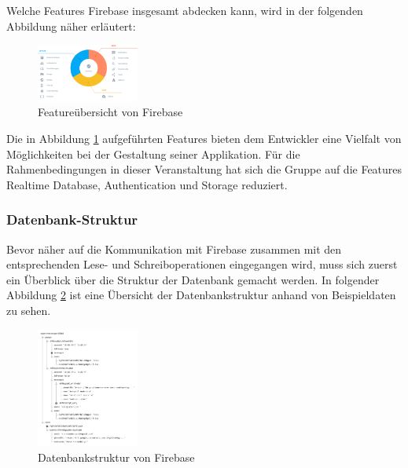 Welche Features Firebase insgesamt abdecken kann, wird in der folgenden Abbildung näher erläutert:

\begin{figure}[ht]
  \centering
    \includegraphics[width=0.3\textwidth]{images/firebase_overview}
    \caption{Featureübersicht von Firebase}
	 \label{fig:firebase_overview}
\end{figure}

Die in Abbildung \ref{fig:firebase_overview} aufgeführten Features bieten dem Entwickler eine Vielfalt von Möglichkeiten bei der Gestaltung seiner Applikation. Für die Rahmenbedingungen in dieser Veranstaltung hat sich die Gruppe auf die Features Realtime Database, Authentication und Storage reduziert.  

\subsubsection{Datenbank-Struktur}
Bevor näher auf die Kommunikation mit Firebase zusammen mit den entsprechenden Lese- und Schreiboperationen eingegangen wird, muss sich zuerst ein Überblick über die Struktur der Datenbank gemacht werden.
In folgender Abbildung \ref{fig:firebase_datastructure} ist eine Übersicht der Datenbankstruktur anhand von Beispieldaten zu sehen.

\begin{figure}[ht]
  \centering
    \includegraphics[width=0.3\textwidth]{images/firebase_datastructure}
    \caption{Datenbankstruktur von Firebase}
	 \label{fig:firebase_datastructure}
\end{figure}

